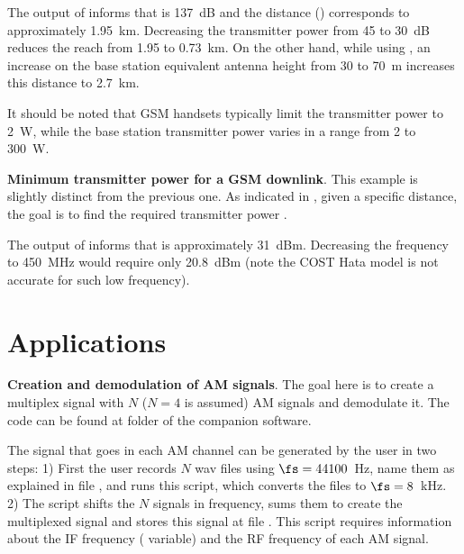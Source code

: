 

The output of  informs that  is 137~dB and
the distance () corresponds to approximately 1.95~km. Decreasing the transmitter
power   from 45 to 30~dB reduces the reach from 1.95 to 0.73~km. On the other
hand, while using , an
increase on the base station equivalent antenna height  from 30 to 70~m increases
this distance to 2.7~km.

It should be noted that GSM handsets typically limit the transmitter power to 2~W, while
the base station transmitter power varies in a range from 2 to 300~W.
\eExample

\bExample \textbf{Minimum transmitter power for a GSM downlink}.
This example is slightly distinct from the previous one. As indicated in 
, given a specific distance, the goal
is to find the required transmitter power .



The output of  informs that  is approximately 31~dBm.
Decreasing the frequency to 450~MHz would require only 20.8~dBm (note the COST Hata model is
not accurate for such low frequency).
\eExample

\section{Applications}

\bApplication \textbf{Creation and demodulation of AM signals}.
\label{app:amDemodulation2}
The goal here is to create a multiplex signal with $N$ ($N=4$ is assumed) AM signals and demodulate it. The code can be found at folder  of the companion software.

The signal that goes in each AM channel can be generated by the user in two steps: 1) First the user records $N$ wav files using $\fs=44100$~Hz, name them as explained in file , and runs this script, which converts the files to $\fs=8$~kHz. 2) 
	The script  shifts the $N$ signals in frequency, sums them to create the multiplexed signal and stores this signal at file . This script requires information about the IF frequency ( variable) and the RF frequency of each AM signal. 
	
